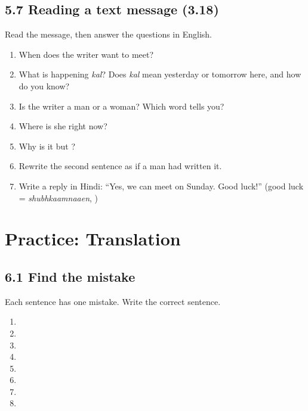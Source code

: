 \subsection{5.7 Reading a text message (3.18)}

Read the message, then answer the questions in English.

\medskip
\colorbox{shaderow}{\parbox{\dimexpr\linewidth-2\fboxsep\relax}{%
  }}
\medskip

\begin{enumerate}
  \item When does the writer want to meet?
  \item What is happening \emph{kal}? Does \emph{kal} mean yesterday or tomorrow here, and how do you know?
  \item Is the writer a man or a woman? Which word tells you?
  \item Where is she right now?
  \item Why is it   but   ?
  \item Rewrite the second sentence as if a man had written it.
  \item Write a reply in Hindi: ``Yes, we can meet on Sunday. Good luck!'' (good luck = \textit{shubhkaamnaaen}, )
\end{enumerate}

\clearpage
\section{Practice: Translation}

\subsection{6.1 Find the mistake}

Each sentence has one mistake. Write the correct sentence.

\begin{enumerate}
  \item {}
  \item {}
  \item {}
  \item {}
  \item {}
  \item {}
  \item {}
  \item {}
\end{enumerate}


